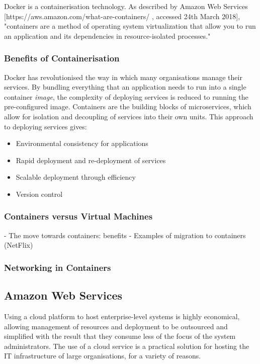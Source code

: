 	Docker is a containerisation technology. As described by Amazon Web Services [https://aws.amazon.com/what-are-containers/ , accessed 24th March 2018], "containers are a method of operating system virtualization that allow you to run an application and its dependencies in resource-isolated processes."
	
		\subsubsection{Benefits of Containerisation}
		
		Docker has revolutionised the way in which many organisations manage their services. By bundling everything that an application needs to run into a single container \textit{image}, the complexity of deploying services is reduced to running the pre-configured image. Containers are the building blocks of microservices, which allow for isolation and decoupling of services into their own units. This approach to deploying services gives:
		
		
		\begin{itemize}
			\item Environmental consistency for applications
			
			\item Rapid deployment and re-deployment of services
			
			\item Scalable deployment through efficiency
			
			\item Version control
		\end{itemize}
		
		\subsubsection{Containers versus Virtual Machines}
		
		- The move towards containers: benefits
		- Examples of migration to containers (NetFlix)
		
		\subsubsection{Networking in Containers}
		

	\subsection{Amazon Web Services}
		
	Using a cloud platform to host enterprise-level systems is highly economical, allowing management of resources and deployment to be outsourced and simplified with the result that they consume less of the focus of the system administrators. The use of a cloud service is a practical solution for hosting the IT infrastructure of large organisations, for a variety of reasons. 
	
